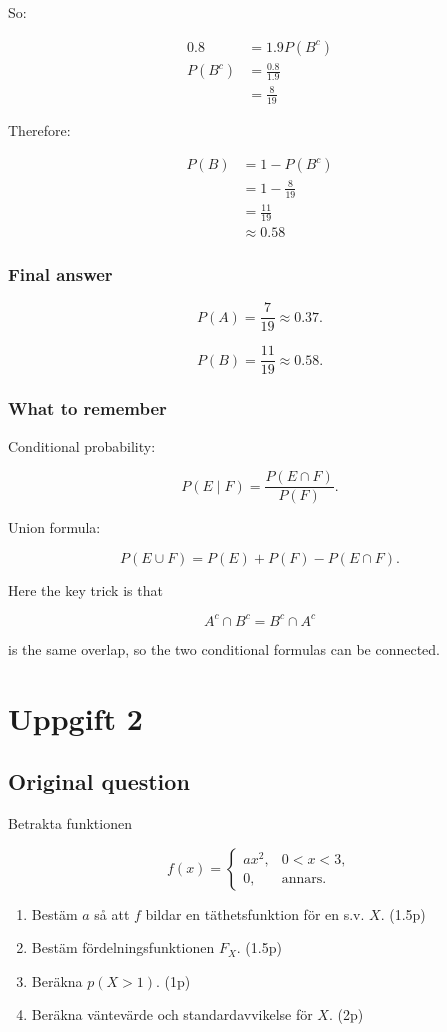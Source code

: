 \documentclass[10pt]{article}
\begin{document}
So:

\begin{align*}
0.8
&=
1.9P(B^c) \\[2mm]
P(B^c)
&=
\frac{0.8}{1.9} \\[2mm]
&=
\frac{8}{19}
\end{align*}

Therefore:

\begin{align*}
P(B)
&=
1-P(B^c) \\[2mm]
&=
1-\frac{8}{19} \\[2mm]
&=
\frac{11}{19} \\[2mm]
&\approx 0.58
\end{align*}

\subsubsection*{Final answer}
\[
P(A)=\frac{7}{19}\approx 0.37.
\]

\[
P(B)=\frac{11}{19}\approx 0.58.
\]

\subsubsection*{What to remember}
Conditional probability:

\[
P(E\mid F)
=
\frac{P(E\cap F)}{P(F)}.
\]

Union formula:

\[
P(E\cup F)
=
P(E)+P(F)-P(E\cap F).
\]

Here the key trick is that

\[
A^c\cap B^c
=
B^c\cap A^c
\]

is the same overlap, so the two conditional formulas can be connected.

\section*{Uppgift 2}

\subsection*{Original question}
Betrakta funktionen

\[
f(x)=
\begin{cases}
ax^2,
& 0<x<3,\\
0,
& \text{annars.}
\end{cases}
\]

\begin{enumerate}[label=\alph*)]
\item
Bestäm $a$ så att $f$ bildar en täthetsfunktion för en s.v. $X$.
\hfill (1.5p)

\item
Bestäm fördelningsfunktionen $F_X$.
\hfill (1.5p)

\item
Beräkna $p(X>1)$.
\hfill (1p)

\item
Beräkna väntevärde och standardavvikelse för $X$.
\hfill (2p)
\end{enumerate}
\end{document}
